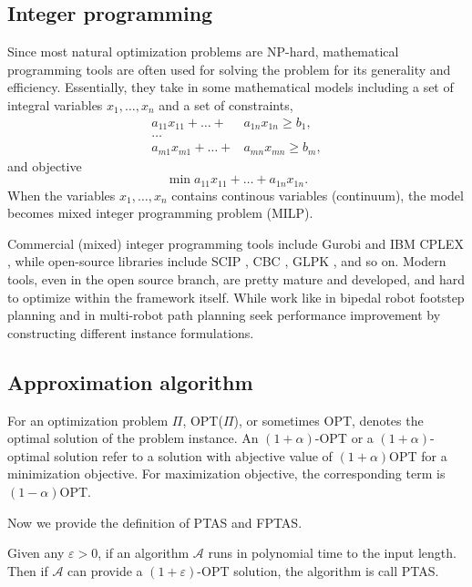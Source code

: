 \subsection{Integer programming}
Since most natural optimization problems are NP-hard, mathematical programming tools are often 
used for solving the problem for its generality and efficiency. Essentially, they take in
some mathematical models including a set of integral variables $x_1, \dots, x_n$ and a set of constraints,
\begin{align*}
    a_{11} x_{11} + \dots + & a_{1n} x_{1n} \geq b_1,\\
    \dots & \\
    a_{m1} x_{m1} + \dots + & a_{mn} x_{mn} \geq b_m,
\end{align*}
and objective 
\[
    \min a_{11} x_{11} + \dots + a_{1n} x_{1n}.
\]
When the variables $x_1, \dots, x_n$ contains continous variables (continuum), the model becomes mixed integer programming problem (MILP).

Commercial (mixed) integer programming tools include Gurobi \cite{optimization2019gurobi} and IBM CPLEX \cite{cplex2009v12}, while open-source 
libraries include SCIP \cite{achterberg2009scip}, CBC \cite{forrest2005cbc}, GLPK \cite{makhorin2008glpk}, and so on. 
Modern tools, even in the open source branch, are pretty mature and developed, and hard to optimize within the framework itself. 
While work like \cite{deits2014footstep} in bipedal robot footstep planning and \cite{guo2021spatial} in multi-robot path planning 
seek performance improvement by constructing different instance formulations.

\subsection{Approximation algorithm}
For an optimization problem $\Pi$, OPT($\Pi$), or sometimes OPT, 
denotes the optimal solution of the problem instance. An $(1+\alpha)$-OPT or a $(1+\alpha)$-optimal solution refer
to a solution with abjective value of $(1+\alpha)$OPT for a minimization objective. For maximization objective,
the corresponding term is $(1-\alpha)$OPT.

Now we provide the definition of PTAS and FPTAS.
\begin{definition}
    Given any $\varepsilon>0$, if an algorithm $\mathcal A$ runs in polynomial time to the input length. 
    Then if $\mathcal A$ can provide a $(1+\varepsilon)$-OPT solution, the algorithm is call PTAS.
\end{definition}


